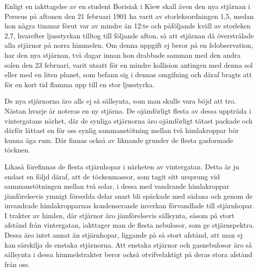 \documentclass[a4paper, 12pt, oneside, swedish]{article}
\begin{document}
Enligt en iakttagelse av en student Borisiak i Kiew skall även den nya stjärnan i Perseus på aftonen den 21 februari 1901 ha varit av storleksordningen 1,5, medan hon några timmar förut var av mindre än 12:te och påföljande kväll av storleken 2,7, hvarefter ljusstyrkan tilltog till följande afton, så att stjärnan då överstrålade alla stjärnor på norra himmelen. Om denna uppgift ej beror på en felobservation, har den nya stjärnan, två dagar innan hon drabbade samman med den andra solen den 23 februari, varit utsatt för en mindre kollision antingen med denna sol eller med en liten planet, som befann sig i dennas omgifning och däraf bragts att för en kort tid flamma upp till en stor ljusstyrka.

De nya stjärnorna äro alls ej så sällsynta, som man skulle vara böjd att tro. Nästan hvarje år noteras en ny stjärna. De ojämförligt flesta av dessa uppträda i vintergatans närhet, där de synliga stjärnorna äro ojämförligt tätast packade och därför lättast en för oss synlig sammanstötning mellan två himlakroppar bör kunna äga rum. Där finnas också av liknande grunder de flesta gasformade töcknen.

Likaså förefinnas de flesta stjärnhopar i närheten av vintergatan. Detta är ju endast en följd däraf, att de töckenmassor, som tagit sitt ursprung vid sammanstötningen mellan två solar, i dessa med vandrande himlakroppar jämförelsevis ymnigt försedda delar snart bli späckade med sådana och genom de invandrade himlakropparnas kondenserande inverkan förvandlade till stjärnhopar. I trakter av himlen, där stjärnor äro jämförelsevis sällsynta, såsom på stort afstånd från vintergatan, iakttager man de flesta nebulosor, som ge stjärnspektra. Dessa äro intet annat än stjärnhopar, liggande på så stort afstånd, att man ej kan särskilja de enstaka stjärnorna. Att enstaka stjärnor och gasnebulosor äro så sällsynta i dessa himmelstrakter beror också otvifvelaktigt på deras stora afstånd från oss.
\end{document}
